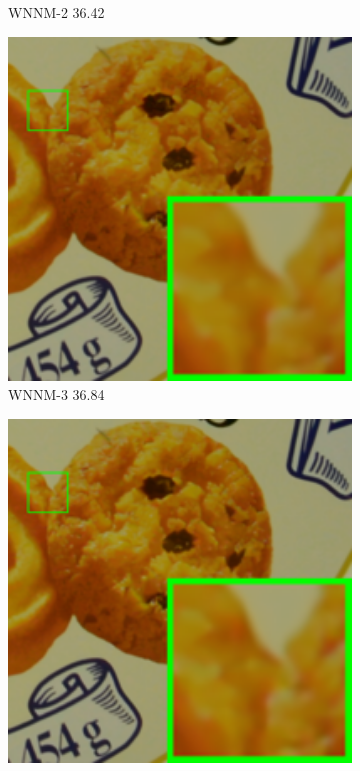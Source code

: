 \begin{figure}
\begin{subfigure}[t]{0.19\textwidth}
		\caption{WNNM-2 36.42}
    \end{subfigure}
    \hfill
    \begin{subfigure}[t]{0.19\textwidth}
        \centering
        \includegraphics[width=1\textwidth]{images/mcwnnm/cc/resize_br_WNNM_ADMM_NL_CC15_d600_iso3200_2.png}
		\caption{WNNM-3 36.84}
    \end{subfigure}
    \hfill
    \begin{subfigure}[t]{0.19\textwidth}
        \centering
        \includegraphics[width=1\textwidth]{images/mcwnnm/cc/resize_br_CWNNM_ADMM_NL_CC15_d600_iso3200_2.png}

\end{subfigure}
\end{figure}
